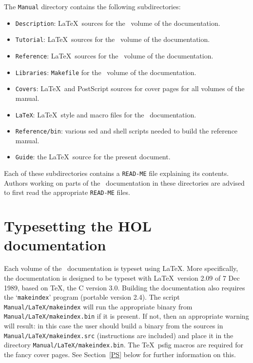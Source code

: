 The {\tt Manual} directory contains the following subdirectories:

\begin{itemize}

\item {\tt Description}: \LaTeX\ sources for the \DESCRIPTION\ volume
of the documentation.

\item {\tt Tutorial}: \LaTeX\ sources for the \TUTORIAL\ volume
of the documentation.

\item {\tt Reference}: \LaTeX\ sources for the \REFERENCE\ volume
of the documentation.

\item {\tt Libraries}: {\tt Makefile} for the \LIBRARIES\ volume
of the documentation.

\item {\tt Covers}: \LaTeX\ and PostScript sources for cover pages
for all volumes of the manual.

\item {\tt LaTeX}: \LaTeX\ style and macro files for the \HOL\ documentation.

\item {\tt Reference/bin}: various sed and shell scripts needed to build the
reference manual.

\item {\tt Guide}: the \LaTeX\ source for the present document.

\end{itemize}

\noindent Each of these subdirectories contains a {\tt READ-ME} file explaining
its contents.  Authors working on parts of the \HOL\ documentation in these
directories are advised to first read the appropriate {\tt READ-ME} files.

\section{Typesetting the HOL documentation}

Each volume of the \HOL\ documentation is typeset using \LaTeX.  More
specifically, the documentation is designed to be typeset with \LaTeX\ version
2.09 of 7 Dec 1989, based on \TeX, the C version 3.0. Building the
documentation also requires the `{\tt makeindex}' program (portable version
2.4). The script {\tt Manual/LaTeX/makeindex} will run the appropriate binary
from {\tt Manual/LaTeX/makeindex.bin} if it is present. If not, then an
appropriate warning will result: in this case the user should build a binary
from the sources in {\tt Manual/LaTeX/makeindex.src} (instructions are
included) and place it in the directory {\tt Manual/LaTeX/makeindex.bin}.
The \TeX\ psfig macros are required for the fancy cover pages.  See
Section~\ref{PS} below for further information on this.

